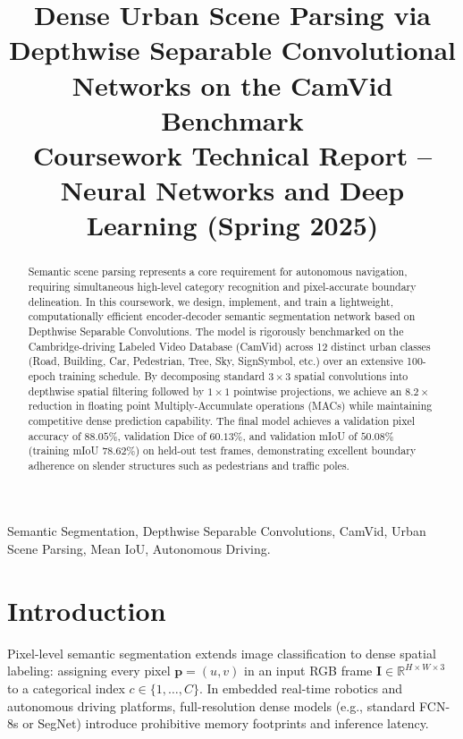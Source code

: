 \documentclass[conference]{IEEEtran}
\begin{document}
\title{Dense Urban Scene Parsing via Depthwise Separable Convolutional Networks on the CamVid Benchmark\\
\large Coursework Technical Report -- Neural Networks and Deep Learning (Spring 2025)}

\author{
}

\maketitle

\begin{abstract}
Semantic scene parsing represents a core requirement for autonomous navigation, requiring simultaneous high-level category recognition and pixel-accurate boundary delineation. In this coursework, we design, implement, and train a lightweight, computationally efficient encoder-decoder semantic segmentation network based on Depthwise Separable Convolutions. The model is rigorously benchmarked on the Cambridge-driving Labeled Video Database (CamVid) across 12 distinct urban classes (Road, Building, Car, Pedestrian, Tree, Sky, SignSymbol, etc.) over an extensive 100-epoch training schedule. By decomposing standard $3 \times 3$ spatial convolutions into depthwise spatial filtering followed by $1 \times 1$ pointwise projections, we achieve an $8.2\times$ reduction in floating point Multiply-Accumulate operations (MACs) while maintaining competitive dense prediction capability. The final model achieves a validation pixel accuracy of $88.05\%$, validation Dice of $60.13\%$, and validation mIoU of $50.08\%$ (training mIoU $78.62\%$) on held-out test frames, demonstrating excellent boundary adherence on slender structures such as pedestrians and traffic poles.
\end{abstract}

\begin{IEEEkeywords}
Semantic Segmentation, Depthwise Separable Convolutions, CamVid, Urban Scene Parsing, Mean IoU, Autonomous Driving.
\end{IEEEkeywords}

\section{Introduction}
Pixel-level semantic segmentation extends image classification to dense spatial labeling: assigning every pixel $\mathbf{p} = (u, v)$ in an input RGB frame $\mathbf{I} \in \mathbb{R}^{H \times W \times 3}$ to a categorical index $c \in \{1, \dots, C\}$. In embedded real-time robotics and autonomous driving platforms, full-resolution dense models (e.g., standard FCN-8s or SegNet) introduce prohibitive memory footprints and inference latency.
\end{document}
